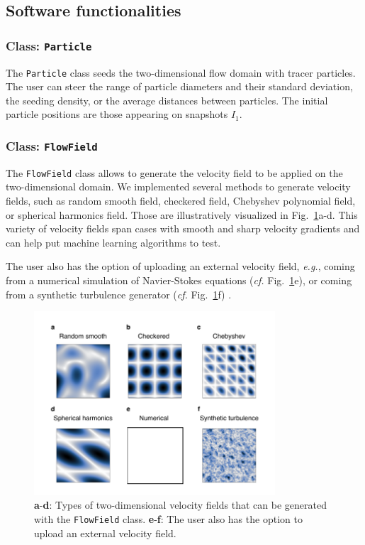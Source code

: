 \documentclass[a4paper,fleqn]{cas-dc}
\begin{document}
\subsection{Software functionalities}

\subsubsection{Class: \texttt{Particle}} \label{sec:class-Particle}

The \texttt{Particle} class seeds the two-dimensional flow domain with tracer particles. The user can steer the range of particle diameters and their standard deviation, the seeding density, or the average distances between particles. The initial particle positions are those appearing on snapshots $I_1$.

\subsubsection{Class: \texttt{FlowField}} \label{sec:class-FlowField}

The \texttt{FlowField} class allows to generate the velocity field to be applied on the two-dimensional domain. We implemented several methods to generate velocity fields, such as random smooth field, checkered field, Chebyshev polynomial field, or spherical harmonics field. Those are illustratively visualized in Fig.~\ref{fig:velocity-fields}a-d. This variety of velocity fields span cases with smooth and sharp velocity gradients and can help put machine learning algorithms to test.

The user also has the option of uploading an external velocity field, \textit{e.g.}, coming from a numerical simulation of Navier-Stokes equations (\textit{cf.} Fig.~\ref{fig:velocity-fields}e), or coming from a synthetic turbulence generator (\textit{cf.} Fig.~\ref{fig:velocity-fields}f) \citep{saad2017scalable, richards2018fast}.

\begin{figure}[t]
\centering
\includegraphics[width=9cm]{velocity-fields.pdf}
\caption{\textbf{a}-\textbf{d}: Types of two-dimensional velocity fields that can be generated with the \texttt{FlowField} class. \textbf{e}-\textbf{f}: The user also has the option to upload an external velocity field.}
\label{fig:velocity-fields}
\end{figure}
\end{document}
